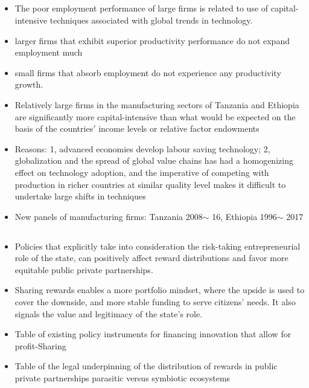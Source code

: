 \documentclass[10pt]{article} %
\begin{document}
    \subsection{\cite{DiaoElllisMcMillanRodrik2021}}
    \begin{itemize}
        \item The poor employment performance of large firms is related to use of capital-intensive techniques associated with global trends in technology.
        \item larger firms that exhibit superior productivity performance do not expand employment much
        \item small firms that absorb employment do not experience any productivity growth. 
        \item Relatively large firms in the manufacturing sectors of Tanzania and Ethiopia are significantly more capital-intensive than what would be expected on the basis of the countries$\prime$ income levels or relative factor endowments
        \item Reasons: 1, advanced economies develop labour saving technology; 2, globalization and the spread of global value chains has had a homogenizing effect on technology adoption, and the imperative of competing with production in richer countries at similar quality level makes it difficult to undertake large shifts in techniques
        \item New panels of manufacturing firms: Tanzania 2008$\sim$ 16, Ethiopia 1996$\sim$ 2017
    \end{itemize}

    \subsection{\cite{LaplaneMazzucato2020}}
    \begin{itemize}
        \item Policies that explicitly take into consideration the risk-taking entrepreneurial role of the state, can positively affect reward distributions and favor more equitable public private partnerships.
        \item Sharing rewards enables a more portfolio mindset, where the upside is used to cover the downside, and more stable funding to serve citizens' needs. It also signals the value and legitimacy of the state’s role.
        \item Table of existing policy instruments for financing innovation that allow for profit-Sharing
        \item Table of the legal underpinning of the distribution of rewards in public private partnerships parasitic versus symbiotic ecosystems
    \end{itemize}
\end{document}
